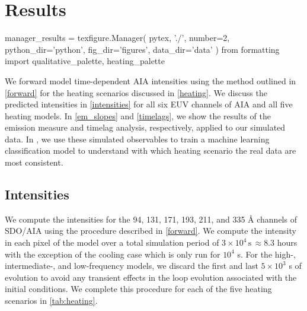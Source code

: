 \section{Results}\label{results}

\begin{pycode}
manager_results = texfigure.Manager(
    pytex,
    './',
    number=2,
    python_dir='python',
    fig_dir='figures',
    data_dir='data'
)
from formatting import qualitative_palette, heating_palette
\end{pycode}

We forward model time-dependent AIA intensities using the method outlined in \autoref{forward} for the heating scenarios discussed in \autoref{heating}. We discuss the predicted intensities in \autoref{intensities} for all six EUV channels of AIA and all five heating models. In \autoref{em_slopes} and \autoref{timelags}, we show the results of the emission measure and timelag analysis, respectively, applied to our simulated data. In , we use these simulated observables to train a machine learning classification model to understand with which heating scenario the real data are most consistent.

\subsection{Intensities}\label{intensities}

We compute the intensities for the 94, 131, 171, 193, 211, and 335 \AA{} channels of SDO/AIA using the procedure described in \autoref{forward}. We compute the intensity in each pixel of the model \AR{} over a total simulation period of $3\times10^4\,\mathrm{s}\,\approx8.3$ hours with the exception of the cooling case which is only run for $10^4$ s. For the high-, intermediate-, and low-frequency models, we discard the first and last $5\times10^3$ s of evolution to avoid any transient effects in the loop evolution associated with the initial conditions. We complete this procedure for each of the five heating scenarios in \autoref{tab:heating}.

